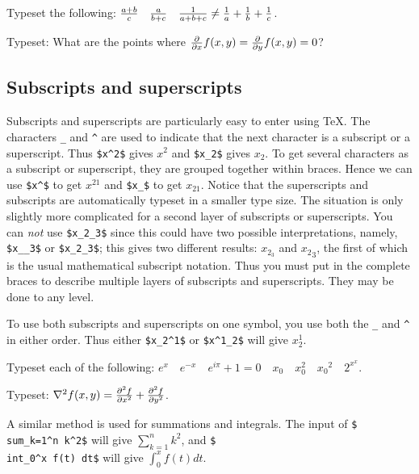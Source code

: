 \exercise Typeset the following: ${a+b\over c}\quad {a\over b+c} 
\quad {1\over a+b+c} \ne {1\over a}+{1\over b}+{1\over c}$. 

\exercise Typeset: What are the points where 
${\partial \over \partial x} f(x,y) = {\partial \over \partial y} 
f(x,y) = 0$? 

\subsection{Subscripts and superscripts} 

Subscripts and superscripts are particularly easy to enter using 
\TeX\null. The characters {\tt \_{}} and {\tt \^{}} are used to 
indicate that the next character is a subscript or a superscript. 
Thus {\tt \$x\^{}2\$} gives $x^2$ and {\tt \$x\_{}2\$} gives 
$x_2$\null.  To get several characters as a subscript or 
superscript, they are grouped together within braces. Hence we 
can use {\tt \$x\^{}\rb\$} to get $x^{21}$ and {\tt \$x\_{}\rb\$} to get $x_{21}$\null. Notice that the 
superscripts and subscripts are automatically typeset in a 
smaller type size. The situation is only slightly more 
complicated for a second layer of subscripts or superscripts. 
You can {\sl not\/} use {\tt \$x\_{}2\_{}3\$} since this could 
have two possible interpretations, namely, {\tt \$x\_{}\_{}3\rb\$} 
or {\tt \$\lb x\_{}2\rb\_{}3\$}; this gives two 
different results: $x_{2_3}$ and ${x_2}_3$, the first of which is 
the usual mathematical subscript notation.  Thus you must put in 
the complete braces to describe multiple layers of subscripts and 
superscripts.  They may be done to any level. 

To use both subscripts and superscripts on one symbol, you use 
both the {\tt \_{}} and {\tt \^{}} in either order.  Thus either 
{\tt \$x\_{}2\^{}1\$} or {\tt\$x\^{}1\_{}2\$} will give $x_2^1$. 

\exercise 
Typeset each of the following: $e^x \quad e^{-x} \quad 
e^{i\pi}+1=0 \quad x_0 \quad x_0^2 \quad {x_0}^2 \quad 2^{x^x}$. 

\exercise Typeset: 
$\nabla^2 f(x,y) = {\partial^2 f \over\partial x^2} 
+ {\partial^2 f \over\partial y^2}$. 
\bigskip 

A similar method is used for summations and integrals.  The input 
of {\tt \$\\sum\_{}\lb k=1\rb\^{}n k\^{}2\$} will give $\sum_{k=1}^n 
k^2$, and {\tt \$\\int\_{}0\^{}x f(t) dt\$} will 
give $\int_0^x f(t) dt$. 

